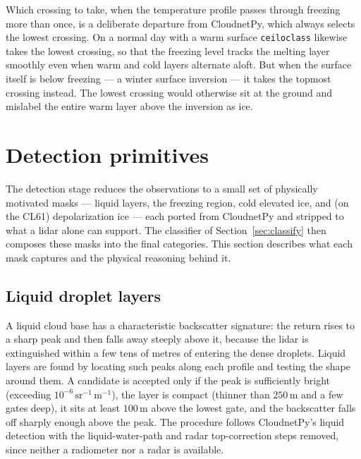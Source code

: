 \documentclass[11pt,a4paper]{article}
\newcommand{\betau}{\ensuremath{\mathrm{sr^{-1}\,m^{-1}}}}
\newcommand{\code}[1]{\texttt{#1}}
\begin{document}
Which crossing to take, when the temperature profile passes through freezing more
than once, is a deliberate departure from CloudnetPy, which always selects the
lowest crossing. On a normal day with a warm surface \code{ceiloclass} likewise
takes the lowest crossing, so that the freezing level tracks the melting layer
smoothly even when warm and cold layers alternate aloft. But when the surface
itself is below freezing --- a winter surface inversion --- it takes the topmost
crossing instead. The lowest crossing would otherwise sit at the ground and
mislabel the entire warm layer above the inversion as ice.

\section{Detection primitives}
\label{sec:detect}

The detection stage reduces the observations to a small set of physically
motivated masks --- liquid layers, the freezing region, cold elevated ice, and (on
the CL61) depolarization ice --- each ported from CloudnetPy and stripped to what a
lidar alone can support. The classifier of Section~\ref{sec:classify} then
composes these masks into the final categories. This section describes what each
mask captures and the physical reasoning behind it.

\subsection{Liquid droplet layers}
\label{sec:liquid}

A liquid cloud base has a characteristic backscatter signature: the return rises
to a sharp peak and then falls away steeply above it, because the lidar is
extinguished within a few tens of metres of entering the dense droplets. Liquid
layers are found by locating such peaks along each profile and testing the shape
around them. A candidate is accepted only if the peak is sufficiently bright
(exceeding $10^{-6}\,\betau$), the layer is compact (thinner than
$250\,\mathrm{m}$ and a few gates deep), it sits at least $100\,\mathrm{m}$ above
the lowest gate, and the backscatter falls off sharply enough above the peak. The
procedure follows CloudnetPy's liquid detection with the liquid-water-path and
radar top-correction steps removed, since neither a radiometer nor a radar is
available.
\end{document}
